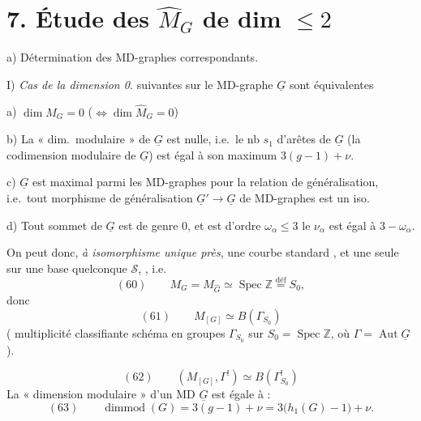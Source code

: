 \documentclass[11pt,a4paper]{article}
\begin{document}
\section{7. Étude des $\widehat{M}_G$ de dim $\leqslant 2$}

a) Détermination des MD-graphes correspondants.

I) \emph{Cas de la dimension 0.}   suivantes sur le MD-graphe $\underline{G}$ sont équivalentes

a) $\dim M_G = 0$ \quad ($\Leftrightarrow \dim \widehat{M}_G = 0$)

b) \struck{\ill{}} La « dim.\ modulaire » de $\underline{G}$ est nulle, i.e.\ le nb $s_1$ d'arêtes de \struck{\ill{}} $\underline{G}$ (la codimension modulaire de $\underline{G}$) est égal à son maximum $3(g-1)+\nu$.

c) \struck{\ill{}} $\underline{G}$ est maximal parmi les MD-graphes pour la relation de généralisation, i.e.\ tout morphisme de généralisation $\underline{G}' \to \underline{G}$ de MD-graphes est un iso.

d) Tout sommet \add{$\alpha$} de $\underline{G}$ est de genre $0$, et est d'ordre \struck{\ill{}} $\omega_\alpha \leqslant 3$  le  $\nu_\alpha$ est égal à $3 - \omega_\alpha$.

On peut donc, \emph{à isomorphisme unique près},  une courbe standard , et une seule sur une base quelconque $\mathcal{S}$, , i.e.
\[
(60)\qquad M_G = M_{\widehat{G}} \simeq \operatorname{Spec} \mathbb{Z} \overset{\text{déf}}{=} S_0,
\]
donc
\[
(61)\qquad M_{[G]} \simeq B(\Gamma_{S_0})
\]
(\struck{\ill{}} multiplicité classifiante  schéma en groupes $\Gamma_{S_0}$ sur $S_0 = \operatorname{Spec} \mathbb{Z}$, où $\Gamma = \operatorname{Aut} \underline{G}$).

\[
(62)\qquad (M_{[G]}, \Gamma^{!}) \simeq B(\Gamma^{!}_{S_0})
\]
La « dimension modulaire  » d'un MD $\underline{G}$ est égale à  :
\[
(63)\qquad \operatorname{dimmod}(G) = 3(g-1) + \nu = 3\bigl(h_1(G) - 1\bigr) + \nu .
\]
\end{document}

